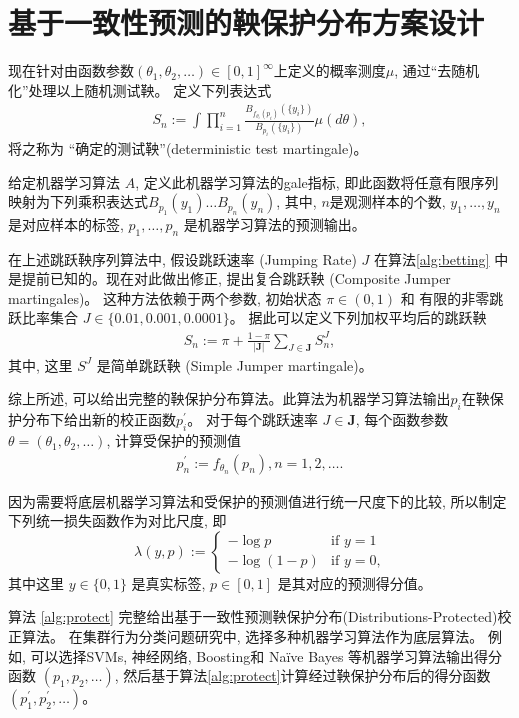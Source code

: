 \section{基于一致性预测的鞅保护分布方案设计}
现在针对由函数参数$(\theta_{1},\theta_{2},\ldots) \in [0,1]^{\infty}$上定义的概率测度$\mu$, 通过“去随机化”处理以上随机测试鞅。 定义下列表达式
\begin{align}
S_{n} := \int\prod_{i=1}^{n}\frac{B_{f_{\theta_{i}}(p_{i})}(\{y_{i}\})}{B_{p_{i}}(\{y_{i}\})}\mu(d\theta),
\end{align}
将之称为 “确定的测试鞅”(deterministic test martingale)。

给定机器学习算法 $A$, 定义此机器学习算法的gale指标\citep{glenn-vovk2019}, 即此函数将任意有限序列映射为下列乘积表达式$B_{p_{1}}(y_{1})\ldots B_{p_{n}}(y_{n})$, 其中, $n$是观测样本的个数, $y_{1},\ldots,y_{n}$ 是对应样本的标签, $p_{1},\ldots,p_{n}$ 是机器学习算法的预测输出。

在上述跳跃鞅序列算法中, 假设跳跃速率 (Jumping Rate) $J$ 在算法\ref{alg:betting} 中是提前已知的。现在对此做出修正, 提出复合跳跃鞅 (Composite Jumper martingales)。 这种方法依赖于两个参数, 初始状态 $\pi \in (0,1)$ 和 有限的非零跳跃比率集合 $J \in \{0.01, 0.001, 0.0001\}$。 据此可以定义下列加权平均后的跳跃鞅
\begin{align}
S_{n} := \pi + \frac{1-\pi}{|\mathbf{J}|}\sum_{J \in \mathbf{J}}S_{n}^{J},
\end{align}
其中, 这里 $S^{J}$ 是简单跳跃鞅 (Simple Jumper martingale)。

综上所述, 可以给出完整的鞅保护分布算法。此算法为机器学习算法输出$p_{i}$在鞅保护分布下给出新的校正函数$p_{i}^{\prime}$。 对于每个跳跃速率 $J \in \mathbf{J}$, 每个函数参数 $\theta = (\theta_{1}, \theta_{2},\ldots)$, 计算受保护的预测值
\begin{align}
p_{n}^{\prime} := f_{\theta_{n}}(p_{n}),  n=1,2,\ldots.
\end{align}

因为需要将底层机器学习算法和受保护的预测值进行统一尺度下的比较, 所以制定下列统一损失函数作为对比尺度, 即
\begin{equation}
  \lambda(y,p) :=
    \begin{cases}
      -\log{p} & \text{if $y=1$}\\
      -\log{(1-p)} & \text{if $y=0$,}
    \end{cases}       
\end{equation}
其中这里 $y \in \{0,1\}$ 是真实标签, $p \in [0,1]$ 是其对应的预测得分值。

算法 \ref{alg:protect} 完整给出基于一致性预测鞅保护分布(Distributions-Protected)校正算法。 在集群行为分类问题研究中, 选择多种机器学习算法作为底层算法。 例如, 可以选择SVMs, 神经网络, Boosting和 Na\"{i}ve Bayes 等机器学习算法输出得分函数 $(p_1, p_2, \ldots)$, 然后基于算法\ref{alg:protect}计算经过鞅保护分布后的得分函数 $(p_1^{\prime}, p_2^{\prime}, \ldots)$。

